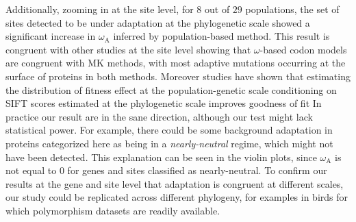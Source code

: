 \documentclass{article}
\begin{document}
Additionally, zooming in at the site level, for $8$ out of $29$ populations, the set of sites detected to be under adaptation at the phylogenetic scale showed a significant increase in $\omega_{\mathrm{A}}$ inferred by population-based method.
This result is congruent with other studies at the site level showing that $\omega$-based codon models are congruent with MK methods, with most adaptive mutations occurring at the surface of proteins in both methods\cite{moutinho_impact_2019}.
Moreover studies have shown that estimating the distribution of fitness effect at the population-genetic scale conditioning on SIFT scores estimated at the phylogenetic scale improves goodness of fit\cite{chen_hunting_2021}
In practice our result are in the sane direction, although our test might lack statistical power.
For example, there could be some background adaptation in proteins categorized here as being in a \textit{nearly-neutral} regime, which might not have been detected.
This explanation can be seen in the violin plots, since $\omega_{\mathrm{A}}$ is not equal to $0$ for genes and sites classified as nearly-neutral.
To confirm our results at the gene and site level that adaptation is congruent at different scales, our study could be replicated across different phylogeny, for examples in birds for which polymorphism datasets are readily available.
\end{document}
